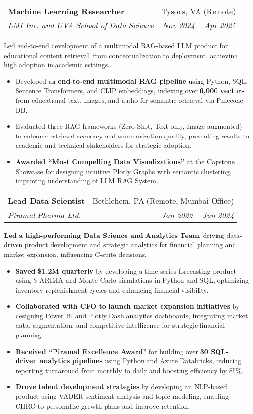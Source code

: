 \documentclass[letterpaper,11pt]{article}
\makeatletter
\newcommand{\resumeItem}[1]{
\justifying
  \item{\small{#1}}
  \vspace{-2px}
}
\newcommand{\resumeSubheading}[4]{
  \item
    \begin{tabular*}{1\textwidth}{l@{\extracolsep{\fill}}r}
      \textbf{\large{#1}} & {\small{#2}} \\
      {\textsl{{#3}}} & {\textsl{\small{#4}}}
    \end{tabular*}
  \vspace{-0.5cm}
}
\newcommand{\resumeItemListStart}{
  \vspace{-5pt}
  \begin{itemize}[leftmargin=0.21in, label=\textbullet]
}
\newcommand{\resumeItemListEnd}{\end{itemize}}
\makeatother
\begin{document}
\resumeSubheading
    {Machine Learning Researcher}
    {Tysons, VA (Remote)}
    {LMI Inc. and UVA School of Data Science}
    {Nov 2024 -- Apr 2025}
\vspace{1pt}
\resumeItem{Led end-to-end development of a multimodal RAG-based LLM product for educational content retrieval, from conceptualization to deployment, achieving high adoption in academic settings.}
\resumeItemListStart
\resumeItem{Developed an \textbf{end-to-end multimodal RAG pipeline} using Python, SQL, Sentence Transformers, and CLIP embeddings, indexing over \textbf{6,000 vectors} from educational text, images, and audio for semantic retrieval via Pinecone DB.}
\resumeItem{Evaluated three RAG frameworks (Zero-Shot, Text-only, Image-augmented) to enhance retrieval accuracy and summarization quality, presenting results to academic and technical stakeholders for strategic adoption.}
\resumeItem{\textbf{Awarded “Most Compelling Data Visualizations”} at the Capstone Showcase for designing intuitive Plotly Graphs with semantic clustering, improving  understanding of LLM RAG System.}
\resumeItemListEnd

\vspace{-3pt}
\resumeSubheading
    {Lead Data Scientist}
    {Bethlehem, PA (Remote, Mumbai Office)}
    {Piramal Pharma Ltd.}
    {Jan 2022 -- Jun 2024}
\vspace{1pt}
\resumeItem{\textbf{Led a high-performing Data Science and Analytics Team}, driving data-driven product development and strategic analytics for financial planning and market expansion, influencing C-suite decisions.}
\resumeItemListStart
\resumeItem{\textbf{Saved \$1.2M quarterly} by developing a time-series forecasting product using S-ARIMA and Monte Carlo simulations in Python and SQL, optimizing inventory replenishment cycles and enhancing financial visibility.}
\resumeItem{\textbf{Collaborated with CFO to launch market expansion initiatives} by designing Power BI and Plotly Dash analytics dashboards, integrating market data, segmentation, and competitive intelligence for strategic financial planning.}
\resumeItem{\textbf{Received “Piramal Excellence Award”} for building over \textbf{30 SQL-driven analytics pipelines} using Python and Azure Databricks, reducing reporting turnaround from monthly to daily and boosting efficiency by 85\%.}
\resumeItem{\textbf{Drove talent development strategies} by developing an NLP-based product using VADER sentiment analysis and topic modeling, enabling CHRO to personalize growth plans and improve retention.}
\resumeItemListEnd
\end{document}
